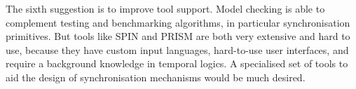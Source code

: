 \documentclass[a4paper, 10pt]{article}
\newcommand*\cleartooddpage{
	\clearpage
	\ifthenelse{\isodd{\thepage}}
		{}
		{\newpage \mbox{} \clearpage}
}
\begin{document}
The sixth suggestion is to improve tool support. Model checking is able to complement testing and benchmarking algorithms, in particular synchronisation primitives. But tools like SPIN and PRISM are both very extensive and hard to use, because they have custom input languages, hard-to-use user interfaces, and require a background knowledge in temporal logics. A specialised set of tools to aid the design of synchronisation mechanisms would be much desired.

% 
\end{document}
